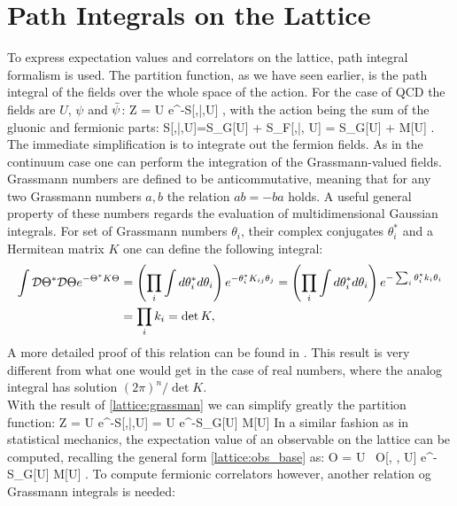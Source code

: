 \section{Path Integrals on the Lattice}
\label{sec:pathintegral}
To express expectation values and correlators on the lattice, path integral formalism is used. The partition function, as we have seen earlier, is the path integral of the fields over the whole space of the action. For the case of QCD the fields are $U$, $\psi$ and $\bar{\psi}$:
\beq
	Z = \int \D\psi\D\bpsi\D U e^{-S[\psi,\bar{\psi},U] }  ,
\eeq
with the action being the sum of the gluonic and fermionic parts:
\beq
S[\psi,\bar{\psi},U]=S_G[U] + S_F[\psi,\bar{\psi}, U] = S_G[U] + \bpsi M[U] \psi.
\eeq
The immediate simplification is to integrate out the fermion fields. As in the continuum case one can perform the integration of the Grassmann-valued fields. \\
Grassmann numbers are defined to be anticommutative, meaning that for any two Grassmann numbers $a,b$ the relation $ab=-ba$ holds. A useful general property of these numbers regards the evaluation of multidimensional Gaussian integrals. For set of Grassmann numbers $\theta_i$, their complex conjugates $\theta_i^*$ and a Hermitean matrix $K$ one can define the following integral:
\begin{align}
    \label{lattice:grassman}
    \int \mathcal{D}\Theta^*\mathcal{D}\Theta e^{-\Theta^* K \Theta } &= \left( \prod_i\int d\theta_i^*d\theta_i \right)  e^{-\theta_i^* K_{ij} \theta_j } =  \left( \prod_i\int d\theta_i^*d\theta_i \right)  e^{-\sum_i\theta_i^* k_i \theta_i } \\\nonumber
    &= \prod_i k_i = \det K,
\end{align} 
A more detailed proof of this relation can be found in \cite{peskin}. This result is very different from what one would get in the case of real numbers, where the analog integral has solution $(2\pi)^n/\det K$. \\
With the result of \cref{lattice:grassman} we can simplify greatly the partition function:
\beq
	Z = \int \D\psi\D\bpsi\D U e^{-S[\psi,\bar{\psi},U] }  = \int \D U e^{-S_G[U] } \det M[U] 
\eeq
In a similar fashion as in statistical mechanics, the expectation value of an observable on the lattice can be computed, recalling the general form \cref{lattice:obs_base} as:
\beq
    \langle O \rangle =   \int \D U ~O[\psi, \bpsi, U] e^{-S_G[U] } \det M[U] .
    \label{lattice:expectation}
\eeq
To compute fermionic correlators however, another relation og Grassmann integrals is needed:
